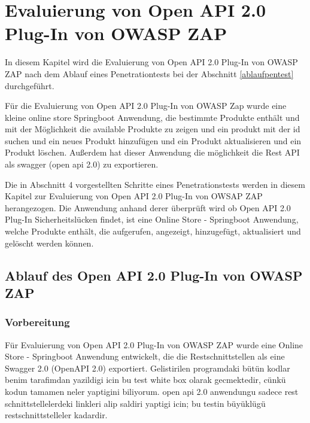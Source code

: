 \chapter{Evaluierung von Open API 2.0 Plug-In von OWASP ZAP}
\label{cha:k5}

In diesem Kapitel wird die Evaluierung von Open API 2.0 Plug-In von OWASP ZAP nach dem Ablauf eines Penetrationtests bei der Abschnitt \ref{ablaufpentest} durchgeführt.

Für die Evaluierung von Open API 2.0 Plug-In von OWASP Zap wurde eine kleine online store Springboot Anwendung, die bestimmte Produkte enthält und mit der Möglichkeit die available Produkte zu zeigen und ein produkt mit der id suchen und ein neues Produkt hinzufügen und ein Produkt aktualisieren und ein Produkt löschen. Außerdem hat dieser Anwendung die möglichkeit die Rest API als swagger (open api 2.0)   zu exportieren.

Die in Abschnitt 4 vorgestellten Schritte eines Penetrationstests werden in diesem Kapitel zur Evaluierung von Open API 2.0 Plug-In von OWSAP ZAP herangezogen. Die Anwendung anhand derer überprüft wird ob Open API 2.0 Plug-In Sicherheitslücken findet, ist eine Online Store - Springboot Anwendung, welche Produkte enthält, die aufgerufen, angezeigt, hinzugefügt, aktualisiert und gelöscht werden können.

\section{Ablauf des Open API 2.0 Plug-In von OWASP ZAP}

\subsection{Vorbereitung}

Für Evaluierung von Open API 2.0 Plug-In von OWASP ZAP wurde eine Online Store - Springboot Anwendung entwickelt, die die Restschnittstellen als eine Swagger 2.0 (OpenAPI 2.0) exportiert. Gelistirilen programdaki bütün kodlar benim tarafimdan yazildigi icin bu test white box olarak gecmektedir, cünkü kodun tamamen neler yaptigini biliyorum. open api 2.0 anwendungu sadece rest schnittstellelerdeki linkleri alip saldiri yaptigi icin; bu testin büyüklügü restschnittstelleler kadardir.

